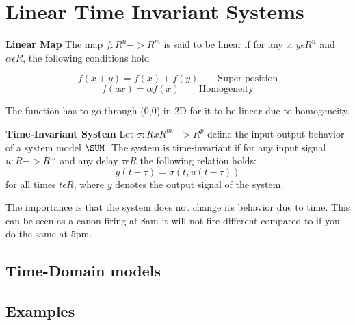\section{Linear Time Invariant Systems}

\textbf{Linear Map} \newline
The map $f: R^n -> R^m$ is said to be linear if for any $x,y \epsilon R^n$ and
$\alpha \epsilon R$, the following conditions hold

$$f(x+y) = f(x) + f(y)  \qquad \text{Super position}$$
$$f(ax) = \alpha f(x) \qquad \text{Homogeneity}$$

The function has to go through (0,0) in 2D for it to be linear due to homogeneity.


\textbf{Time-Invariant System} \newline
Let $\sigma: R x R^m -> R^p$ define the input-output behavior of a system model $\SUM$.
The system \SUM is time-invariant if for any input signal $u:R->R^m$
and any delay $\tau \epsilon R$ the following relation holds:
$$ y(t-\tau)= \sigma(t,u(t-\tau))$$
for all times $t\epsilon R$, where $y$ denotes the output signal of the system.

The importance is that the system does not change its behavior due to time.
This can be seen as a canon firing at 8am it will not fire different
compared to if you do the same at 5pm.

\subsection{Time-Domain models}




\subsection{Examples}

